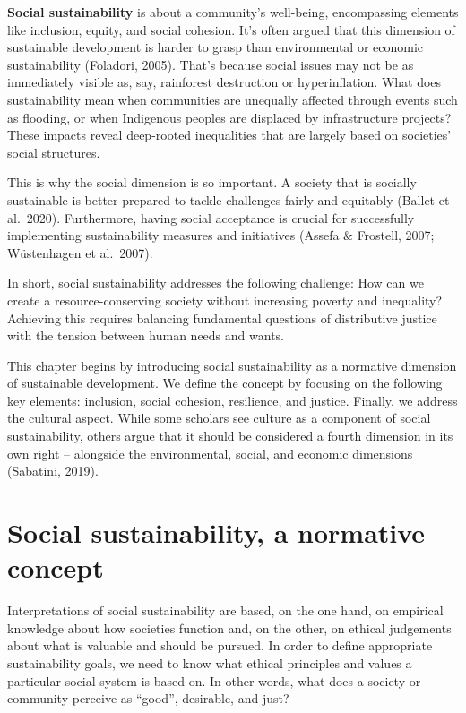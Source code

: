 \documentclass[
  a4paper,
  openany]{book}
\begin{document}
\textbf{Social sustainability} is about a community's well-being,
encompassing elements like inclusion, equity, and social cohesion. It's
often argued that this dimension of sustainable development is harder to
grasp than environmental or economic sustainability (Foladori, 2005).
That's because social issues may not be as immediately visible as, say,
rainforest destruction or hyperinflation. What does sustainability mean
when communities are unequally affected through events such as flooding,
or when Indigenous peoples are displaced by infrastructure projects?
These impacts reveal deep-rooted inequalities that are largely based on
societies' social structures.

This is why the social dimension is so important. A society that is
socially sustainable is better prepared to tackle challenges fairly and
equitably (Ballet et al.~2020). Furthermore, having social acceptance is
crucial for successfully implementing sustainability measures and
initiatives (Assefa \& Frostell, 2007; Wüstenhagen et al.~2007).

In short, social sustainability addresses the following challenge: How
can we create a resource-conserving society without increasing poverty
and inequality? Achieving this requires balancing fundamental questions
of distributive justice with the tension between human needs and wants.

This chapter begins by introducing social sustainability as a normative
dimension of sustainable development. We define the concept by focusing
on the following key elements: inclusion, social cohesion, resilience,
and justice. Finally, we address the cultural aspect. While some
scholars see culture as a component of social sustainability, others
argue that it should be considered a fourth dimension in its own right
-- alongside the environmental, social, and economic dimensions
(Sabatini, 2019).

\section{Social sustainability, a normative
concept}\label{social-sustainability-a-normative-concept}

Interpretations of social sustainability are based, on the one hand, on
empirical knowledge about how societies function and, on the other, on
ethical judgements about what is valuable and should be pursued. In
order to define appropriate sustainability goals, we need to know what
ethical principles and values a particular social system is based on. In
other words, what does a society or community perceive as ``good'',
desirable, and just?
\end{document}

